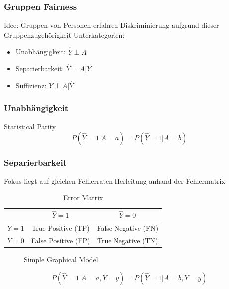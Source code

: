 \documentclass[aspectratio=169]{beamer}
\begin{document}
\begin{frame}
	\frametitle{Gruppen Fairness}
	Idee: Gruppen von Personen erfahren Diskriminierung aufgrund dieser Gruppenzugehörigkeit
	Unterkategorien:
	\begin{itemize}
		\item Unabhängigkeit: $\hat{Y} \perp A$
		\item Separierbarkeit: $\hat{Y} \perp A | Y$ 
		\item Suffizienz: $Y \perp A | \hat{Y}$
	\end{itemize}
\end{frame}

\begin{frame}
	\frametitle{Unabhängigkeit}
	Statistical Parity
	$$P(\hat{Y} = 1 | A = a) = P(\hat{Y} = 1 | A = b)$$
\end{frame}

\begin{frame}
	\frametitle{Separierbarkeit}
	Fokus liegt auf gleichen Fehlerraten
	Herleitung anhand der Fehlermatrix
	\begin{table}[H]
	\centering
	\begin{tabular}{c|c|c}
	\toprule
	 & $\hat{Y} = 1$ & $\hat{Y} = 0$ \\
	\midrule
	$Y = 1$ & True Positive (TP) & False Negative (FN) \\
	$Y = 0$ & False Positive (FP) & True Negative (TN) \\
	\bottomrule
	\end{tabular}
	\caption{Error Matrix}
	\end{table}
	\begin{figure}[H]
	\centering
	\caption{Simple Graphical Model}
	\end{figure}
	$$P(\hat{Y} = 1 | A = a, Y = y) = P(\hat{Y} = 1 | A = b, Y = y)$$
\end{frame}
\end{document}

